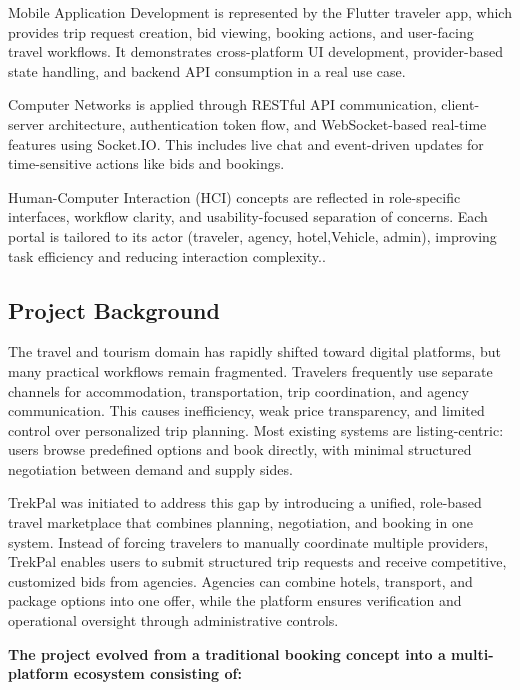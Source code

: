 \documentclass[12pt,a4paper]{article}
\newlength{\ThesisParagraphIndent}
\newcommand{\ThesisParagraph}[1]{%
  \par\begingroup
  \setlength{\leftskip}{\ThesisParagraphIndent}%
  \setlength{\parindent}{0pt}%
  \noindent#1\par
  \endgroup}
\begin{document}
\ThesisParagraph{Mobile Application Development is represented by the Flutter traveler app, which provides trip request creation, bid viewing, booking actions, and user-facing travel workflows. It demonstrates cross-platform UI development, provider-based state handling, and backend API consumption in a real use case.}


\ThesisParagraph{Computer Networks is applied through RESTful API communication, client-server architecture, authentication token flow, and WebSocket-based real-time features using Socket.IO. This includes live chat and event-driven updates for time-sensitive actions like bids and bookings.}


\ThesisParagraph{Human-Computer Interaction (HCI) concepts are reflected in role-specific interfaces, workflow clarity, and usability-focused separation of concerns. Each portal is tailored to its actor (traveler, agency, hotel,Vehicle, admin), improving task efficiency and reducing interaction complexity..}


\subsection{Project Background}

\ThesisParagraph{The travel and tourism domain has rapidly shifted toward digital platforms, but many practical workflows remain fragmented. Travelers frequently use separate channels for accommodation, transportation, trip coordination, and agency communication. This causes inefficiency, weak price transparency, and limited control over personalized trip planning. Most existing systems are listing-centric: users browse predefined options and book directly, with minimal structured negotiation between demand and supply sides.}


\ThesisParagraph{TrekPal was initiated to address this gap by introducing a unified, role-based travel marketplace that combines planning, negotiation, and booking in one system. Instead of forcing travelers to manually coordinate multiple providers, TrekPal enables users to submit structured trip requests and receive competitive, customized bids from agencies. Agencies can combine hotels, transport, and package options into one offer, while the platform ensures verification and operational oversight through administrative controls.}


\ThesisParagraph{\textbf{The project evolved from a traditional booking concept into a multi-platform ecosystem consisting of:}}
\end{document}
